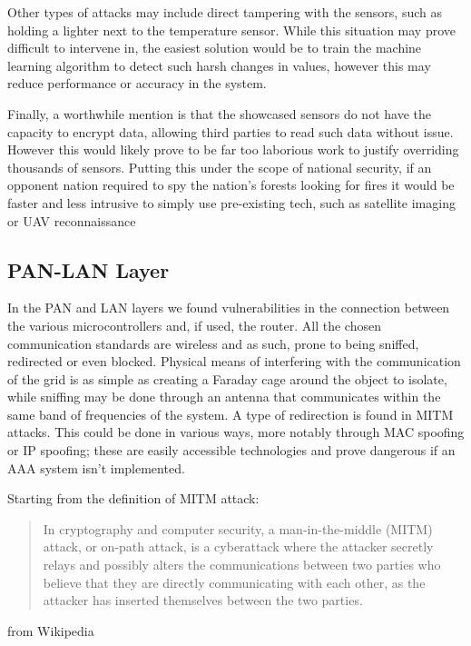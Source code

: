 \documentclass[11pt]{article}
\begin{document}
Other types of attacks may include direct tampering with the sensors, such as holding a lighter next to the temperature sensor. While this situation may prove difficult to intervene in, the easiest solution would be to train the machine learning algorithm to detect such harsh changes in values, however this may reduce performance or accuracy in the system. \par \vspace{0.5 cm}

Finally, a worthwhile mention is that the showcased sensors do not have the capacity to encrypt data, allowing third parties to read such data without issue. However this would likely prove to be far too laborious work to justify overriding thousands of sensors. Putting this under the scope of national security, if an opponent nation required to spy the nation's forests looking for fires it would be faster and less intrusive to simply use pre-existing tech, such as satellite imaging or UAV reconnaissance \par \vspace{0.5 cm}  

\newpage

\subsection{PAN-LAN Layer}

In the PAN and LAN layers we found vulnerabilities in the connection between the various microcontrollers and, if used, the router. All the chosen communication standards are wireless and as such, prone to being sniffed, redirected or even blocked. Physical means of interfering with the communication of the grid is as simple as creating a Faraday cage around the object to isolate, while sniffing may be done through an antenna that communicates within the same band of frequencies of the system. A type of redirection is found in MITM attacks. This could be done in various ways, more notably through MAC spoofing or IP spoofing; these are easily accessible technologies and prove dangerous if an AAA system isn't implemented. \par \vspace{0.5 cm}

Starting from the definition of MITM attack: \begin{quote}
    In cryptography and computer security, a man-in-the-middle (MITM) attack, or on-path attack, is a cyberattack where the attacker secretly relays and possibly alters the communications between two parties who believe that they are directly communicating with each other, as the attacker has inserted themselves between the two parties.
\end{quote} from Wikipedia \par \vspace{0.5 cm}
\end{document}
